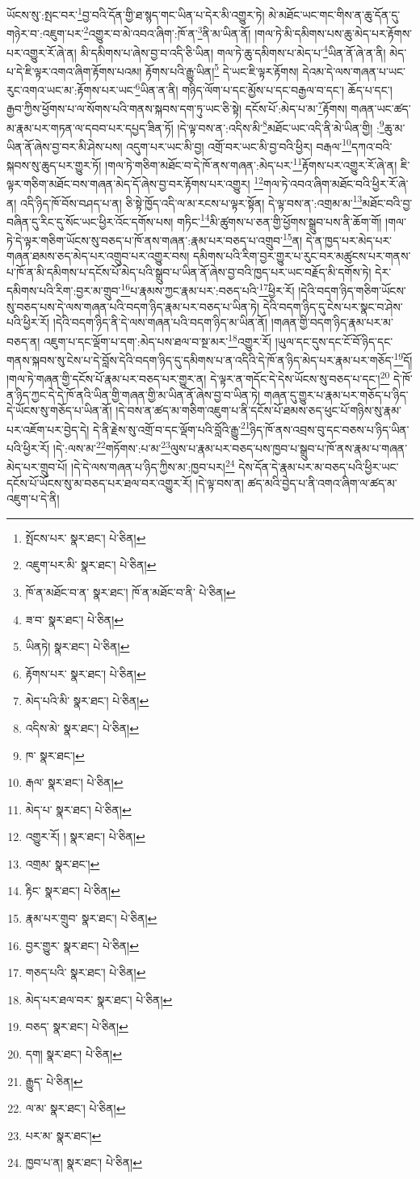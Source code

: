 ཡོངས་སུ་:སྤང་བར་\footnote{སྤོངས་པར་  སྣར་ཐང་།  པེ་ཅིན། }བྱ་བའི་དོན་གྱི་ཐ་སྙད་གང་ཡིན་པ་དེར་མི་འགྱུར་ཏེ། མེ་མཐོང་ཡང་གང་གིས་ན་ཆུ་དོན་དུ་གཉེར་བ་:འཇུག་པར་\footnote{འཇུག་པར་མི་  སྣར་ཐང་།  པེ་ཅིན། }འགྱུར་བ་མེ་འབའ་ཞིག་:ཁོ་ན་\footnote{ཁོ་ན་མཐོང་བ་ན་  སྣར་ཐང་། ཁོ་ན་མཐོང་བ་ནི་  པེ་ཅིན། }ནི་མ་ཡིན་ནོ། །གལ་ཏེ་མི་དམིགས་པས་ཆུ་མེད་པར་རྟོགས་པར་འགྱུར་རོ་ཞེ་ན། མི་དམིགས་པ་ཞེས་བྱ་བ་འདི་ཅི་ཡིན། གལ་ཏེ་ཆུ་དམིགས་པ་མེད་པ་\footnote{ཟ་བ་  སྣར་ཐང་།  པེ་ཅིན། }ཡིན་ནོ་ཞེ་ན་ནི། མེད་པ་དེ་ཇི་ལྟར་འགའ་ཞིག་རྟོགས་པའམ། རྟོགས་པའི་རྒྱུ་ཡིན།\footnote{ཡིནཏེ།  སྣར་ཐང་།  པེ་ཅིན། } དེ་ཡང་ཇི་ལྟར་རྟོགས། དེའམ་དེ་ལས་གཞན་པ་ཡང་རུང་འགའ་ཡང་མ་:རྟོགས་པར་ཡང་\footnote{རྟོགས་པར་  སྣར་ཐང་།  པེ་ཅིན། }ཡིན་ན་ནི། གཉིད་ལོག་པ་དང་མྱོས་པ་དང་བརྒྱལ་བ་དང་། ཆོད་པ་དང་། རྒྱབ་ཀྱིས་ཕྱོགས་པ་ལ་སོགས་པའི་གནས་སྐབས་དག་ཏུ་ཡང་ཅི་སྟེ། དངོས་པོ་:མེད་པ་མ་\footnote{མེད་པའི་མི་  སྣར་ཐང་།  པེ་ཅིན། }རྟོགས། གཞན་ཡང་ཚད་མ་རྣམ་པར་གཏན་ལ་དབབ་པར་དཔྱད་ཟིན་ཏོ། །དེ་ལྟ་བས་ན་:འདིས་མི་\footnote{འདིས་མེ་  སྣར་ཐང་།  པེ་ཅིན། }མཐོང་ཡང་འདི་ནི་མེ་ཡིན་གྱི། :\footnote{ཁ་  སྣར་ཐང་། }ཆུ་མ་ཡིན་ནོ་ཞེས་བྱ་བར་མི་ཤེས་པས། འདུག་པར་ཡང་མི་བྱ། འགྲོ་བར་ཡང་མི་བྱ་བའི་ཕྱིར། བརྒལ་\footnote{རྒལ་  སྣར་ཐང་།  པེ་ཅིན། }དཀའ་བའི་སྐབས་སུ་ཆུད་པར་གྱུར་ཏོ། །གལ་ཏེ་གཅིག་མཐོང་བ་དེ་ཁོ་ནས་གཞན་:མེད་པར་\footnote{མེད་པ་  སྣར་ཐང་།  པེ་ཅིན། }རྟོགས་པར་འགྱུར་རོ་ཞེ་ན། ཇི་ལྟར་གཅིག་མཐོང་བས་གཞན་མེད་དོ་ཞེས་བྱ་བར་རྟོགས་པར་འགྱུར། \footnote{འགྱུར་རོ། །   སྣར་ཐང་།  པེ་ཅིན། }གལ་ཏེ་འབའ་ཞིག་མཐོང་བའི་ཕྱིར་རོ་ཞེ་ན། འདི་ཉིད་ཁོ་བོས་བཤད་པ་ན། ཅི་སྟེ་ཁྱོད་འདི་ལ་མ་རངས་པ་ལྟར་སྟོན། དེ་ལྟ་བས་ན་:འགྲམ་མ་\footnote{འགྲམ་  སྣར་ཐང་། }མཐོང་བའི་བྱ་བཞིན་དུ་རིང་དུ་སོང་ཡང་ཕྱིར་འོང་དགོས་པས། གཏིང་\footnote{རྟིང་  སྣར་ཐང་།  པེ་ཅིན། }མི་ཚུགས་པ་ཅན་གྱི་ཕྱོགས་སྒྲུབ་པས་ནི་ཆོག་གོ། །གལ་ཏེ་དེ་ལྟར་གཅིག་ཡོངས་སུ་བཅད་པ་ཁོ་ནས་གཞན་:རྣམ་པར་བཅད་པ་འགྲུབ་\footnote{རྣམ་པར་གྲུབ་  སྣར་ཐང་།  པེ་ཅིན། }ན། དེ་ན་ཁྱད་པར་མེད་པར་གཞན་ཐམས་ཅད་མེད་པར་འགྲུབ་པར་འགྱུར་བས། དམིགས་པའི་རིག་བྱར་གྱུར་པ་རུང་བར་མཚུངས་པར་གནས་པ་ཁོ་ན་མི་དམིགས་པ་དངོས་པོ་མེད་པའི་སྒྲུབ་པ་ཡིན་ནོ་ཞེས་བྱ་བའི་ཁྱད་པར་ཡང་བརྗོད་མི་དགོས་ཏེ། དེར་དམིགས་པའི་རིག་:བྱར་མ་གྲུབ་\footnote{བྱར་གྱུར་  སྣར་ཐང་།  པེ་ཅིན། }པ་རྣམས་ཀྱང་རྣམ་པར་:བཅད་པའི་\footnote{གཅད་པའི་  སྣར་ཐང་།  པེ་ཅིན། }ཕྱིར་རོ། །དེའི་བདག་ཉིད་གཅིག་ཡོངས་སུ་བཅད་པས་དེ་ལས་གཞན་པའི་བདག་ཉིད་རྣམ་པར་བཅད་པ་ཡིན་ཏེ། དེའི་བདག་ཉིད་དུ་ངེས་པར་སྣང་བ་ཤེས་པའི་ཕྱིར་རོ། །དེའི་བདག་ཉིད་ནི་དེ་ལས་གཞན་པའི་བདག་ཉིད་མ་ཡིན་ནོ། །གཞན་གྱི་བདག་ཉིད་རྣམ་པར་མ་བཅད་ན། འཇུག་པ་དང་ལྡོག་པ་དག་:མེད་པས་ཐལ་བ་སྔ་མར་\footnote{མེད་པར་ཐལ་བར་  སྣར་ཐང་།  པེ་ཅིན། }འགྱུར་རོ། །ཡུལ་དང་དུས་དང་ངོ་བོ་ཉིད་དང་གནས་སྐབས་སུ་ངེས་པ་དེ་བློས་དེའི་བདག་ཉིད་དུ་དམིགས་པ་ན་འདིའི་དེ་ཁོ་ན་ཉིད་མེད་པར་རྣམ་པར་གཅོད་\footnote{བཅད་  སྣར་ཐང་།  པེ་ཅིན། }དོ། །གལ་ཏེ་གཞན་གྱི་དངོས་པོ་རྣམ་པར་བཅད་པར་གྱུར་ན། དེ་ལྟར་ན་གདོང་དེ་དེས་ཡོངས་སུ་བཅད་པ་དང་།\footnote{དག།  སྣར་ཐང་།  པེ་ཅིན། } དེ་ཁོ་ན་ཉིད་ཀྱང་དེ་དེ་ཁོ་ནའི་ཡིན་གྱི་གཞན་གྱི་མ་ཡིན་ནོ་ཞེས་བྱ་བ་ཡིན་ཏེ། གཞན་དུ་གྱུར་པ་རྣམ་པར་གཅོད་པ་ཉིད་དེ་ཡོངས་སུ་གཅོད་པ་ཡིན་ནོ། །དེ་བས་ན་ཚད་མ་གཅིག་འཇུག་པ་ནི་དངོས་པོ་ཐམས་ཅད་ཕུང་པོ་གཉིས་སུ་རྣམ་པར་འཇོག་པར་བྱེད་དེ། དེ་ནི་རྗེས་སུ་འགྲོ་བ་དང་ལྡོག་པའི་བློའི་རྒྱུ་\footnote{རྒྱུད་  པེ་ཅིན། }ཉིད་ཁོ་ནས་འབྲས་བུ་དང་བཅས་པ་ཉིད་ཡིན་པའི་ཕྱིར་རོ། །དེ་:ལས་མ་\footnote{ལ་མ་  སྣར་ཐང་།  པེ་ཅིན། }གཏོགས་:པ་མ་\footnote{པར་མ་  སྣར་ཐང་། }ལུས་པ་རྣམ་པར་བཅད་པས་ཁྱབ་པ་སྒྲུབ་པ་ཁོ་ནས་རྣམ་པ་གཞན་མེད་པར་གྲུབ་པོ། །དེ་དེ་ལས་གཞན་པ་ཉིད་ཀྱིས་མ་:ཁྱབ་པར།\footnote{ཁྱབ་པ་ན།  སྣར་ཐང་།  པེ་ཅིན། } དེས་དོན་དེ་རྣམ་པར་མ་བཅད་པའི་ཕྱིར་ཡང་དངོས་པོ་ཡོངས་སུ་མ་བཅད་པར་ཐལ་བར་འགྱུར་རོ། །དེ་ལྟ་བས་ན། ཚད་མའི་བྱེད་པ་ནི་འགའ་ཞིག་ལ་ཚད་མ་འཇུག་པ་དེ་ནི། 